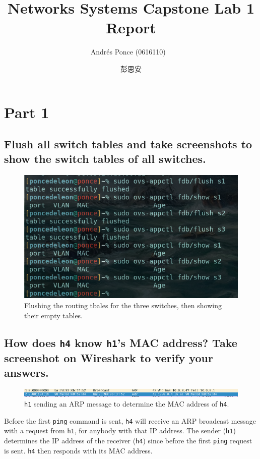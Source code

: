 \documentclass{article}
\author{Andr\'es Ponce (0616110) \
\and
彭思安}
\title{Networks Systems Capstone Lab 1 Report}
\begin{document}
\maketitle
\section{Part 1}

\subsection{Flush all switch tables and take screenshots to show the switch tables of all
switches.}
\begin{figure}[h]
	\centering
	\includegraphics[scale=0.4]{flushSwitch.png}
	\caption{Flushing the routing tbales for the three switches, then showing their empty tables.}
\end{figure}

\subsection{How does \texttt{h4} know \texttt{h1}'s MAC address? Take screenshot on 
Wireshark to verify your answers.}
\begin{figure}[h]
		\centering
		\includegraphics[scale=0.4]{ARP.png}
		\caption{\texttt{h1} sending an ARP message to determine the MAC address of
		\texttt{h4}.}
		\label{fig:Part1}
\end{figure}
Before the first \texttt{ping} command is sent, \texttt{h4} will receive an ARP 
broadcast message with a request from \texttt{h1}, for anybody with that IP address.
The sender (\texttt{h1}) determines the IP address of the receiver (\texttt{h4}) since before
the first \texttt{ping} request is sent.
\texttt{h4} then responds with its MAC address.
\end{document}
